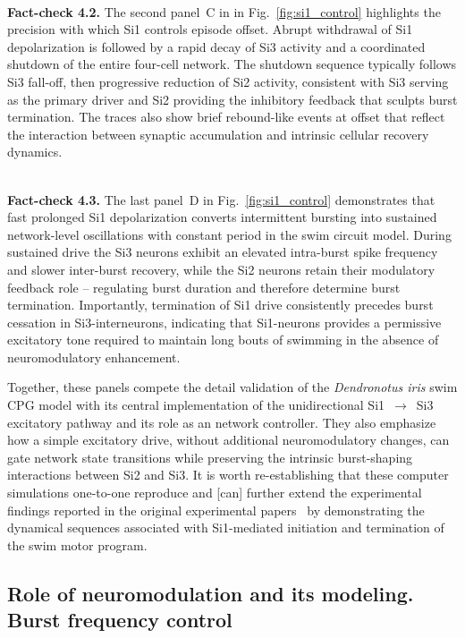 \documentclass[nofootinbib,aip,amsmath,amssymb,reprint,twocolumn,10pt]{revtex4-2}
\begin{document}
 ~\\
{\bf Fact-check 4.2.} The second panel~C in in Fig.~\ref{fig:si1_control} highlights the precision with which Si1 controls episode offset. Abrupt withdrawal of Si1 depolarization is followed by a rapid decay of Si3 activity and a coordinated shutdown of the entire four-cell network. The shutdown sequence typically follows Si3 fall-off, then progressive reduction of Si2 activity, consistent with Si3 serving as the primary driver and Si2 providing the inhibitory feedback that sculpts burst termination. The traces also show brief rebound-like events at offset that reflect the interaction between synaptic accumulation and intrinsic cellular recovery dynamics.

 ~\\
{\bf Fact-check 4.3.} The last panel~D in Fig.~\ref{fig:si1_control} demonstrates that fast prolonged Si1 depolarization converts intermittent bursting into sustained network-level oscillations with constant period in the swim circuit model. During sustained drive the Si3 neurons exhibit an elevated intra-burst spike frequency and slower inter-burst recovery, while the Si2 neurons retain their modulatory feedback role -- regulating burst duration and therefore determine burst termination. Importantly, termination of Si1 drive consistently precedes burst cessation in Si3-interneurons, indicating that Si1-neurons  provides a permissive excitatory tone required to maintain long bouts of swimming in the absence of neuromodulatory enhancement.

Together, these panels compete the detail validation of the {\em Dendronotus iris} swim CPG model with its central implementation of the unidirectional Si1~$\to$~Si3 excitatory pathway and its role as an network controller. They also emphasize how a simple excitatory drive, without additional neuromodulatory changes, can gate network state transitions while preserving the intrinsic burst-shaping interactions between Si2 and Si3. It is worth re-establishing that these computer simulations one-to-one reproduce and [can] further extend the experimental findings reported in the original experimental papers~\cite{sakurai2019command, SakuraiKatz2016} by demonstrating the dynamical sequences associated with Si1-mediated initiation and termination of the swim motor program.



\subsection{Role of neuromodulation and its modeling. Burst frequency control}
\end{document}
